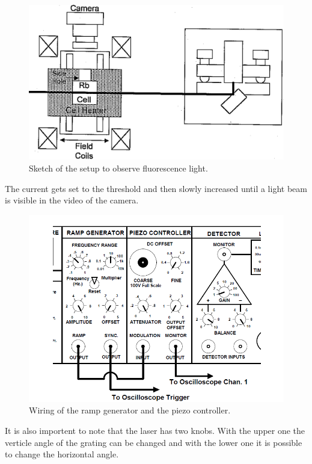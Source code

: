 \begin{figure}[H]
	\centering
	\includegraphics[width=\textwidth]{setup_fluorescence.png}
	\caption{Sketch of the setup to observe fluorescence light. \cite{V60}}
	\label{fig:fl}
\end{figure}

\noindent
The current gets set to the threshold and then slowly increased until a light beam is visible in the video of the 
camera.

\begin{figure}[H]
	\centering
	\includegraphics[width=\textwidth]{setup.png}
	\caption{Wiring of the ramp generator and the piezo controller. \cite{V60}}
	\label{fig:rg}
\end{figure}

\noindent
It is also importent to note that the laser has two knobs. With the upper one the verticle angle of the grating can
be changed and with the lower one it is possible to change the horizontal angle.

